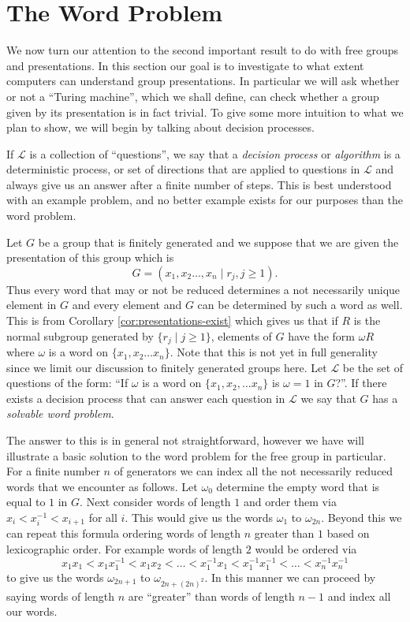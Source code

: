 \section{The Word Problem}
\label{sec:wp}
We now turn our attention to the second important result to do with free groups and presentations. In this section our goal is to investigate to what extent computers can understand group presentations. In particular we will ask whether or not a ``Turing machine'', which we shall define, can check whether a group given by its presentation is in fact trivial. To give some more intuition to what we plan to show, we will begin by talking about decision processes.

If $\mathcal{L}$ is a collection of ``questions'', we say that a \emph{decision process} or \emph{algorithm} is a deterministic process, or set of directions that are applied to questions
in $\mathcal{L}$ and always give us an answer after a finite number of steps. This is best understood with an example problem, and no better example exists for our purposes than the word problem.

Let $G$ be a group that is finitely generated and we suppose that we are given the presentation of this group which is
\begin{equation*}
  G = (x_1,x_2\dots,x_n \mid r_j,j \geq 1).
\end{equation*}
Thus every word that may or not be reduced determines a not necessarily unique element in $G$ and every element and $G$ can be determined by such a word as well. This is from Corollary \ref{cor:presentations-exist} which gives us that if $R$ is the normal subgroup generated by $\{r_j \mid j \geq 1\}$, elements of $G$ have the form $\omega R$ where $\omega$ is a word on $\{x_1,x_2 \dots x_n\}$. Note that this is not yet in full generality since we limit our discussion to finitely generated groups here. Let $\mathcal{L}$ be the set of questions of the form: ``If $\omega$ is a word on $\{x_1,x_2, \dots x_n \}$ is $\omega = 1$ in $G$?''.
If there exists a decision process that can answer each question in $\mathcal{L}$ we say that $G$ has a \emph{solvable word problem}.

The answer to this is in general not straightforward, however we have will illustrate a basic solution to the word problem for the free group in particular. For a finite number $n$ of generators we can index all the not necessarily reduced words that we encounter as follows. Let $\omega_0$ determine the empty word that is equal to $1$ in $G$. Next consider words of length $1$ and order them via $x_i < x_i^{-1}< x_{i+1}$ for all $i$. This would give us the words $\omega_1$ to $\omega_{2n}$. Beyond this we can repeat this formula ordering words of length $n$ greater than $1$ based on lexicographic order. For example words of length $2$ would be ordered via
\begin{equation*}
  x_1x_1 < x_1x_1^{-1} < x_1x_2 < \dots < x_1^{-1}x_1 < x_1^{-1}x_1^{-1} < \dots < x_n^{-1}x_n^{-1}
\end{equation*}
to give us the words $\omega_{2n + 1}$ to $\omega_{2n + (2n)^2}$. In this manner we can proceed by saying words of length $n$ are ``greater'' than words of length $n-1$ and index all our words.

